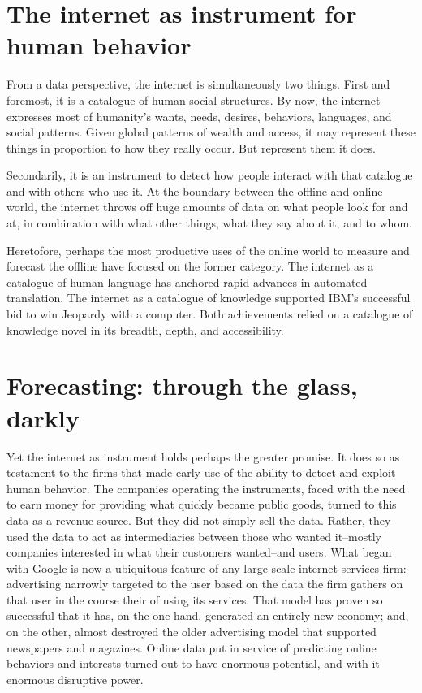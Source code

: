 \documentclass{article}
\begin{document}
\section{The internet as instrument for human behavior}
\label{sec:intern-as-instr}

From a data perspective, the internet is simultaneously two
things. First and foremost, it is a catalogue of human social
structures. By now, the internet expresses most of humanity's wants,
needs, desires, behaviors, languages, and social patterns. Given
global patterns of wealth and access, it may represent these things in
proportion to how they really occur. But represent them it does. 

Secondarily, it is an instrument to detect how people
interact with that catalogue and with others who use it. At the
boundary between the offline and online world, the internet throws off
huge amounts of data on what people look for and at, in combination with what
other things, what they say about it, and to whom. 

Heretofore, perhaps the most productive uses of the online world to
measure and forecast the offline have focused on the former
category. The internet as a catalogue of human language has anchored
rapid advances in automated translation. The internet as a catalogue
of knowledge supported IBM's successful bid to win Jeopardy with a
computer. Both achievements relied on a catalogue of knowledge novel
in its breadth, depth, and accessibility. 




\section{Forecasting: through the glass, darkly}
\label{sec:forec-thro-glass}

Yet the internet as instrument holds perhaps the greater promise.  It
does so as testament to the firms that made early use of the ability
to detect and exploit human behavior. The companies operating the
instruments, faced with the need to earn money for providing what
quickly became public goods, turned to this data as a revenue
source. But they did not simply sell the data. Rather, they used the
data to act as intermediaries between those who wanted it--mostly
companies interested in what their customers wanted--and users. What
began with Google is now a ubiquitous feature of any large-scale
internet services firm: advertising narrowly targeted to the user
based on the data the firm gathers on that user in the course their of
using its services. That model has proven so successful that it has,
on the one hand, generated an entirely new economy; and, on the other,
almost destroyed the older advertising model that supported newspapers
and magazines. Online data put in service of predicting online
behaviors and interests turned out to have enormous potential, and
with it enormous disruptive power.
\end{document}
